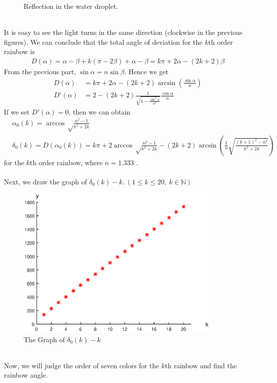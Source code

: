 \documentclass{article}
\begin{document}
\begin{spacing}{1.5}
\begin{figure}[!htb]
\caption{Reflection in the water droplet.}
\label{f3}
\end{figure}
\\
It is easy to see the light turns in the same direction (clockwise in the previous figures). We can conclude that the total angle of deviation for the $k$th order rainbow is \begin{align*}
D(\alpha) = \alpha - \beta + k(\pi - 2\beta )+\alpha - \beta = k\pi +2\alpha-(2k+2)\beta
\end{align*}
From the previous part, $\sin \alpha = n \sin \beta$. Hence we get \begin{align*}
D(\alpha) &= k\pi +2\alpha-(2k+2)\arcsin(\frac{\sin\alpha}{n})\\
D'(\alpha) &= 2 - (2k+2)\frac{1}{\sqrt{1-\frac{\sin^2\alpha}{n^2}}}\frac{\cos \alpha}{n}
\end{align*}
If we set $D'(\alpha)=0$, then we can obtain \begin{align*}
&\alpha_0(k)=\arccos\sqrt\frac{n^2-1}{k^2+2k}\\
&\delta_0(k)=D(\alpha_0(k))= k\pi + 2\arccos\sqrt\frac{n^2-1}{k^2+2k} - (2k+2)\arcsin(\frac{1}{n}\sqrt{\frac{(k+1)^2-n^2}{k^2+2k}})
\end{align*}
for the $k$th order rainbow, where $n=1.333$ \cite{Optics}.
\\
\\
Next, we draw the graph of $\delta_0(k)-k. \ (1\leq k\leq 20, \ k\in \mathbb{N})$\\
\begin{figure}[!htb]
\centering
\includegraphics[width=10cm]{Figure1.eps}
\caption{The Graph of $\delta_0(k)-k$}
\label{1}
\end{figure}\\
Now, we will judge the order of seven colors for the $k$th rainbow and find the rainbow angle.\\ 

\end{spacing}
\end{document}
